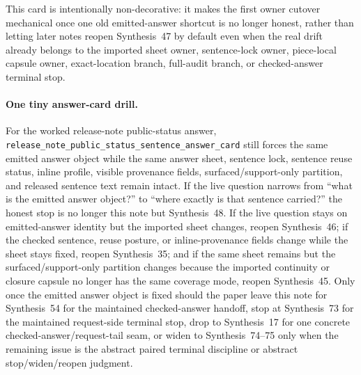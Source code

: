 \documentclass[11pt]{article}
\begin{document}
This card is intentionally non-decorative: it makes the first owner cutover mechanical once one old emitted-answer shortcut is no longer honest, rather than letting later notes reopen Synthesis~47 by default even when the real drift already belongs to the imported sheet owner, sentence-lock owner, piece-local capsule owner, exact-location branch, full-audit branch, or checked-answer terminal stop.\cite{series:workedexample}

\paragraph{One tiny answer-card drill.}
For the worked release-note public-status answer, \nolinkurl{release_note_public_status_sentence_answer_card} still forces the same emitted answer object while the same answer sheet, sentence lock, sentence reuse status, inline profile, visible provenance fields, surfaced/support-only partition, and released sentence text remain intact. If the live question narrows from ``what is the emitted answer object?'' to ``where exactly is that sentence carried?'' the honest stop is no longer this note but Synthesis~48. If the live question stays on emitted-answer identity but the imported sheet changes, reopen Synthesis~46; if the checked sentence, reuse posture, or inline-provenance fields change while the sheet stays fixed, reopen Synthesis~35; and if the same sheet remains but the surfaced/support-only partition changes because the imported continuity or closure capsule no longer has the same coverage mode, reopen Synthesis~45. Only once the emitted answer object is fixed should the paper leave this note for Synthesis~54 for the maintained checked-answer handoff, stop at Synthesis~73 for the maintained request-side terminal stop, drop to Synthesis~17 for one concrete checked-answer/request-tail seam, or widen to Synthesis~74--75 only when the remaining issue is the abstract paired terminal discipline or abstract stop/widen/reopen judgment.\cite{series:workedexample}
\end{document}
